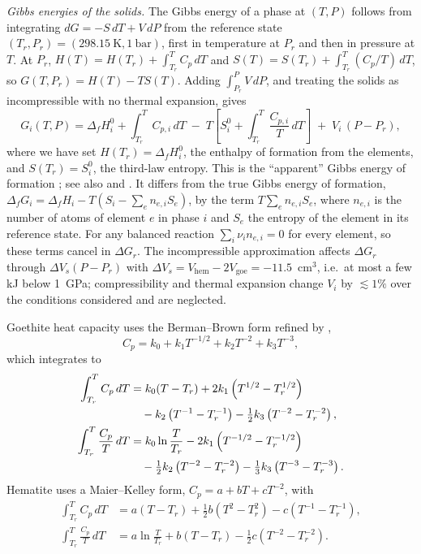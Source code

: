 \textit{Gibbs energies of the solids.} The Gibbs energy of a phase at $(T,P)$ follows from
integrating $dG = -S\,dT + V\,dP$ from the reference state $(T_r,P_r) = (298.15~\mathrm{K}, 1~\mathrm{bar})$,
first in temperature at $P_r$ and then in pressure at $T$. At $P_r$,
$H(T) = H(T_r) + \int_{T_r}^{T}C_p\,dT$ and $S(T) = S(T_r) + \int_{T_r}^{T}(C_p/T)\,dT$, so
$G(T,P_r) = H(T) - T S(T)$. Adding $\int_{P_r}^{P}V\,dP$, and treating the solids as incompressible
with no thermal expansion, gives
\begin{equation}
  G_i(T,P) = \Delta_f H_i^{0} + \int_{T_r}^{T} C_{p,i}\,dT
  \;-\; T\left[S_i^{0} + \int_{T_r}^{T}\frac{C_{p,i}}{T}\,dT\right]
  \;+\; V_i\,(P-P_r),
  \label{eq:gtsi_Gsolid}
\end{equation}
where we have set $H(T_r) = \Delta_f H_i^{0}$, the enthalpy of formation from the elements, and
$S(T_r) = S_i^{0}$, the third-law entropy. This is the ``apparent'' Gibbs energy of formation
\citep{berman1988}; see also \citet{helgeson1978} and \citet{anderson2005}. It differs from
the true Gibbs energy of formation,
$\Delta_f G_i = \Delta_f H_i - T(S_i - \sum_e n_{e,i} S_e)$, by the term $T\sum_e n_{e,i}S_e$,
where $n_{e,i}$ is the number of atoms of element $e$ in phase $i$ and $S_e$ the entropy of the
element in its reference state. For any balanced reaction $\sum_i \nu_i n_{e,i} = 0$ for every element,
so these terms cancel in $\Delta G_r$. The incompressible approximation affects $\Delta G_r$
through $\Delta V_s (P-P_r)$ with $\Delta V_s = V_{\mathrm{hem}} - 2V_{\mathrm{goe}} = -11.5$~cm$^3$,
i.e.\ at most a few kJ below 1~GPa; compressibility and thermal expansion change $V_i$ by
$\lesssim1\%$ over the conditions considered and are neglected.

Goethite heat capacity uses the Berman--Brown form \citep{berman1985} refined by
\citet{majzlan2003},
\begin{equation}
  C_p = k_0 + k_1 T^{-1/2} + k_2 T^{-2} + k_3 T^{-3},
\end{equation}
which integrates to
\begin{align}
  \int_{T_r}^{T} C_p\,dT &= k_0 (T-T_r) + 2k_1\left(T^{1/2}-T_r^{1/2}\right) \notag\\
    &\quad - k_2\left(T^{-1}-T_r^{-1}\right) - \tfrac{1}{2}k_3\left(T^{-2}-T_r^{-2}\right), \\
  \int_{T_r}^{T} \frac{C_p}{T}\,dT &= k_0 \ln\frac{T}{T_r} - 2k_1\left(T^{-1/2}-T_r^{-1/2}\right) \notag\\
    &\quad - \tfrac{1}{2}k_2\left(T^{-2}-T_r^{-2}\right) - \tfrac{1}{3}k_3\left(T^{-3}-T_r^{-3}\right).
\end{align}
Hematite uses a Maier--Kelley form, $C_p = a + bT + cT^{-2}$, with
\begin{align}
  \int_{T_r}^{T} C_p\,dT &= a(T-T_r) + \tfrac{1}{2}b\left(T^2-T_r^2\right) - c\left(T^{-1}-T_r^{-1}\right), \\
  \int_{T_r}^{T} \frac{C_p}{T}\,dT &= a\ln\frac{T}{T_r} + b(T-T_r) - \tfrac{1}{2}c\left(T^{-2}-T_r^{-2}\right).
\end{align}

